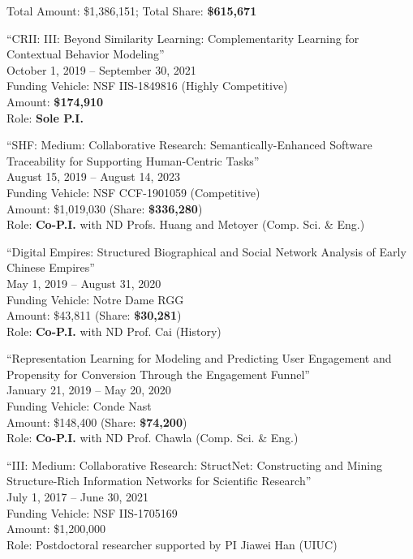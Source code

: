 \documentclass[10pt]{article}
\newenvironment{myindentpar}[1]%
{\begin{list}{}%
         {\setlength{\leftmargin}{#1}}%
         \item[]%
}
{\end{list}}
\newcounter{list}
\begin{document}
\begin{myindentpar}{0.75cm}

\hspace{-0.75cm} Total Amount: \$1,386,151; Total Share: \textbf{\$615,671}

\hspace{-0.75cm}``CRII: III: Beyond Similarity Learning: Complementarity Learning for Contextual Behavior Modeling''\\
October 1, 2019 -- September 30, 2021 \\
Funding Vehicle: NSF IIS-1849816 (Highly Competitive) \\
Amount: \textbf{\$174,910} \\
Role: \textbf{Sole P.I.}

\hspace{-0.75cm}``SHF: Medium: Collaborative Research: Semantically-Enhanced Software Traceability for Supporting Human-Centric Tasks''\\
August 15, 2019 -- August 14, 2023 \\
Funding Vehicle: NSF CCF-1901059 (Competitive) \\
Amount: \$1,019,030 (Share: \textbf{\$336,280}) \\
Role: \textbf{Co-P.I.} with ND Profs. Huang and Metoyer (Comp. Sci. \& Eng.)

\hspace{-0.75cm}``Digital Empires: Structured Biographical and Social Network Analysis of Early Chinese Empires''\\
May 1, 2019 -- August 31, 2020 \\
Funding Vehicle: Notre Dame RGG \\
Amount: \$43,811 (Share: \textbf{\$30,281}) \\
Role: \textbf{Co-P.I.} with ND Prof. Cai (History)

\hspace{-0.75cm}``Representation Learning for Modeling and Predicting User Engagement and Propensity for Conversion Through the Engagement Funnel''\\
January 21, 2019 -- May 20, 2020 \\
Funding Vehicle: Conde Nast \\
Amount: \$148,400 (Share: \textbf{\$74,200}) \\
Role: \textbf{Co-P.I.} with ND Prof. Chawla (Comp. Sci. \& Eng.)

\hspace{-0.75cm}``III: Medium: Collaborative Research: StructNet: Constructing and Mining Structure-Rich Information Networks for Scientific Research''\\
July 1, 2017 -- June 30, 2021 \\
Funding Vehicle: NSF IIS-1705169 \\
Amount: \$1,200,000 \\
Role: Postdoctoral researcher supported by PI Jiawei Han (UIUC)


\end{myindentpar}
\end{document}
